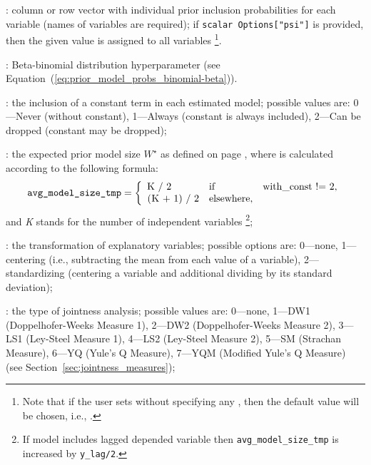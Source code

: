 :\label{opts:psi}
column or row vector with individual prior inclusion
probabilities for each variable (names of variables are
required); if \lstinline!scalar Options["psi"]! is provided,
then the given value is assigned to all variables%
\footnote{Note that if the user sets
	 without specifying
	any , then the default value
	will be chosen, i.e., .}.

: Beta-binomial distribution
	hyperparameter (see Equation~(\ref{eq:prior_model_probs_binomial-beta})).

: the inclusion
of a constant term in each estimated model;
possible values are: 0---Never (without constant),
1---Always (constant is always included),
2---Can be dropped (constant may be dropped);

: the
expected prior model size $W^\star$ as defined on page
\pageref{eq:W_star_definition}, where 
is calculated according to the following formula:
\begin{equation}
	\texttt{\lstinline!avg\_model\_size_tmp!} = \left\{
		\begin{array}{lll}
			\textrm{\lstinline!K / 2!} & \mathrm{if} & \textrm{\lstinline!with_const \!= 2!},\\
			\textrm{\lstinline!(K + 1) / 2!} & \mathrm{elsewhere}, &\\
		\end{array}
		\right.
		\label{eq:avg_model_size_setup}
	\end{equation}
and \textit{K} stands for the number of independent variables%
\footnote{If model includes lagged depended variable
	then \texttt{avg\_model\_size\_tmp} is increased by
	\texttt{y\_lag/2}.};

: the transformation of
explanatory variables; possible options are: 0---none, 1---centering
(i.e., subtracting the mean from each value of a variable),
2---standardizing (centering a variable and additional dividing
by its standard deviation);

: the type of
jointness analysis; possible values are: 0---none,
1---DW1 (Doppelhofer-Weeks Measure 1), 2---DW2 (Doppelhofer-Weeks Measure 2),
3---LS1 (Ley-Steel Measure 1), 4---LS2 (Ley-Steel Measure 2),
5---SM (Strachan Measure), 6---YQ (Yule's Q Measure),
7---YQM (Modified Yule's Q Measure)
(see Section~\ref{sec:jointness_measures});

